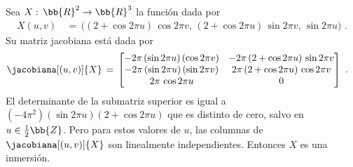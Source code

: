 \begin{ejemplo}
	Sea $X:\,\bb{R}^{2}\rightarrow\bb{R}^{3}$ la funci\'{o}n dada por
	\begin{align*}
		X(u,v) & \,=\,\big(
		(2+\cos 2\pi u)\,\cos 2\pi v,\,
		(2+\cos 2\pi u)\,\sin 2\pi v,\,
		\sin 2\pi u\big)
		\text{ .}
	\end{align*}
	Su matriz jacobiana est\'{a} dada por
	\begin{align*}
		\jacobiana[(u,v)]{X} & \,=\,
			\begin{bmatrix}
				-2\pi\,(\sin 2\pi u)\,(\cos 2\pi v) &
					-2\pi\,(2+\cos 2\pi u)\,\sin 2\pi v \\
				-2\pi\,(\sin 2\pi u)\,(\sin 2\pi v) &
					2\pi\,(2+\cos 2\pi u)\,\cos 2\pi v \\
				2\pi\,\cos 2\pi u & 0
			\end{bmatrix}
		\text{ .}
	\end{align*}
	El determinante de la submatriz superior es igual a
	$(-4\pi^{2})(\sin 2\pi u)(2+\cos 2\pi u)$ que es distinto de cero,
	salvo en $u\in\frac{1}{2}\bb{Z}$. Pero para estos valores de $u$,
	las columnas de $\jacobiana[(u,v)]{X}$ son linealmente
	independientes. Entonces $X$ es una inmersi\'{o}n.
\end{ejemplo}
